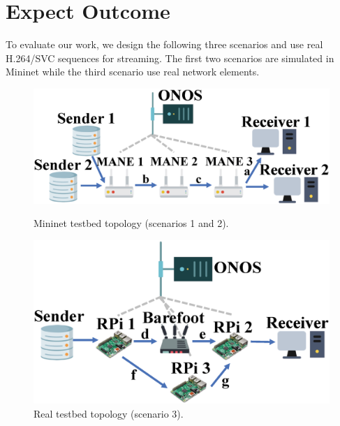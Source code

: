 \section{Expect Outcome} \label{sec:Expect Outcome}

To evaluate our work, we design the following three scenarios and use real H.264/SVC sequences for streaming. The first two scenarios are simulated in Mininet while the third scenario use real network elements. 

\begin{figure}[tbh]
    \centering
    \begin{minipage}[t]{0.24\textwidth}
    \centering
    \includegraphics[width=\textwidth]{fig/scenario_2.eps}
    \caption{Mininet testbed topology (scenarios 1 and 2).}
    \label{scenario_2} 
    \end{minipage}
    \hfill\begin{minipage}[t]{0.23\textwidth}
    \centering
    \includegraphics[width=\textwidth]{fig/scenario_3.eps}
    \caption{Real testbed topology (scenario 3).}
    \label{scenario_3} 
    \end{minipage}
\vspace{-0.1cm}
\end{figure}

